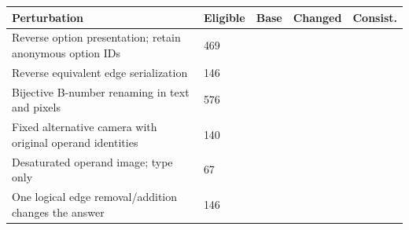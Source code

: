\begin{tabularx}{\linewidth}{XXrrr}
\toprule
Perturbation & Eligible & Base & Changed & Consist.\\\midrule
Reverse option presentation; retain anonymous option IDs & 469 &  &  & \\
Reverse equivalent edge serialization & 146 &  &  & \\
Bijective B-number renaming in text and pixels & 576 &  &  & \\
Fixed alternative camera with original operand identities & 140 &  &  & \\
Desaturated operand image; type only & 67 &  &  & \\
One logical edge removal/addition changes the answer & 146 &  &  & \\
\bottomrule
\end{tabularx}
